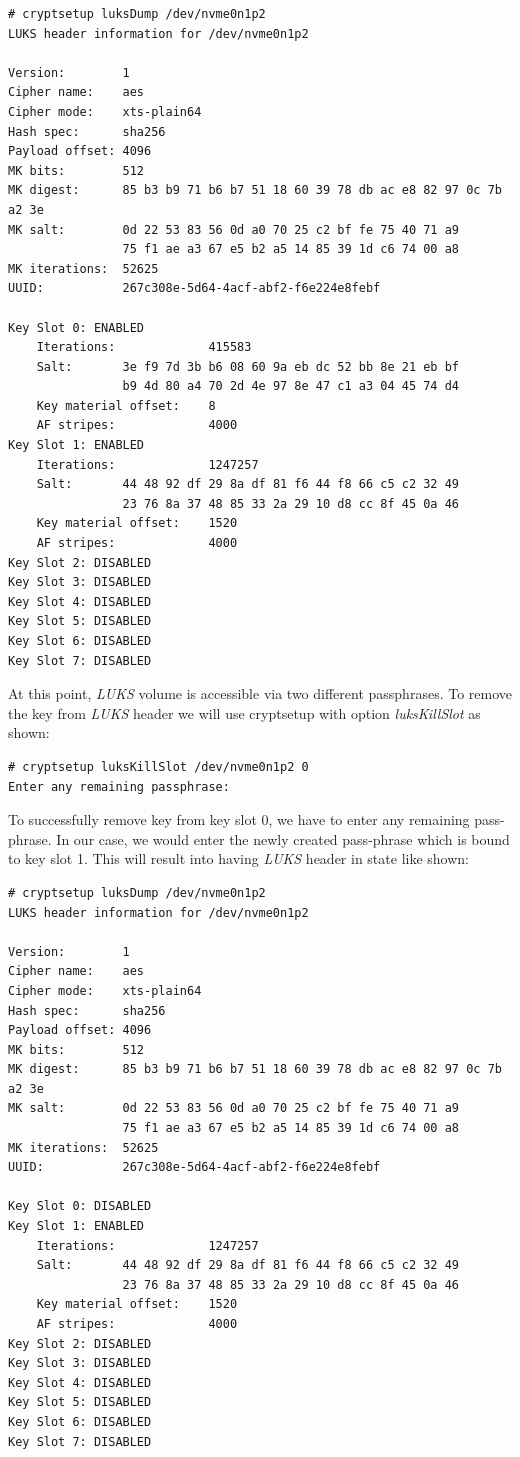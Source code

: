 \begin{lstlisting}[columns=fixed,basicstyle=\ttfamily\footnotesize,tabsize=4,backgroundcolor=\color{yellow!10}]
# cryptsetup luksDump /dev/nvme0n1p2
LUKS header information for /dev/nvme0n1p2

Version:		1
Cipher name:	aes
Cipher mode:	xts-plain64
Hash spec:		sha256
Payload offset:	4096
MK bits:		512
MK digest:		85 b3 b9 71 b6 b7 51 18 60 39 78 db ac e8 82 97 0c 7b a2 3e
MK salt:		0d 22 53 83 56 0d a0 70 25 c2 bf fe 75 40 71 a9
				75 f1 ae a3 67 e5 b2 a5 14 85 39 1d c6 74 00 a8
MK iterations: 	52625
UUID:			267c308e-5d64-4acf-abf2-f6e224e8febf

Key Slot 0: ENABLED
	Iterations:				415583
	Salt:		3e f9 7d 3b b6 08 60 9a eb dc 52 bb 8e 21 eb bf
				b9 4d 80 a4 70 2d 4e 97 8e 47 c1 a3 04 45 74 d4
	Key material offset:	8
	AF stripes:				4000
Key Slot 1: ENABLED
	Iterations:				1247257
	Salt:		44 48 92 df 29 8a df 81 f6 44 f8 66 c5 c2 32 49
				23 76 8a 37 48 85 33 2a 29 10 d8 cc 8f 45 0a 46
	Key material offset:	1520
	AF stripes:				4000
Key Slot 2: DISABLED
Key Slot 3: DISABLED
Key Slot 4: DISABLED
Key Slot 5: DISABLED
Key Slot 6: DISABLED
Key Slot 7: DISABLED
\end{lstlisting}
At this point, {\it LUKS} volume is accessible via two different passphrases.
To remove the key from {\it LUKS} header we will use cryptsetup with option {\it luksKillSlot} as shown:
\begin{lstlisting}[columns=fixed,basicstyle=\ttfamily\footnotesize,tabsize=4,backgroundcolor=\color{yellow!10}]
# cryptsetup luksKillSlot /dev/nvme0n1p2 0
Enter any remaining passphrase:
\end{lstlisting}
To successfully remove key from key slot 0, we have to enter any remaining pass-phrase.
In our case, we would enter the newly created pass-phrase which is bound to key slot 1.
This will result into having {\it LUKS} header in state like shown:
\begin{lstlisting}[columns=fixed,basicstyle=\ttfamily\footnotesize,tabsize=4,backgroundcolor=\color{yellow!10}]
# cryptsetup luksDump /dev/nvme0n1p2
LUKS header information for /dev/nvme0n1p2

Version:		1
Cipher name:	aes
Cipher mode:	xts-plain64
Hash spec:		sha256
Payload offset:	4096
MK bits:		512
MK digest:		85 b3 b9 71 b6 b7 51 18 60 39 78 db ac e8 82 97 0c 7b a2 3e
MK salt:		0d 22 53 83 56 0d a0 70 25 c2 bf fe 75 40 71 a9
				75 f1 ae a3 67 e5 b2 a5 14 85 39 1d c6 74 00 a8
MK iterations: 	52625
UUID:			267c308e-5d64-4acf-abf2-f6e224e8febf

Key Slot 0: DISABLED
Key Slot 1: ENABLED
	Iterations:				1247257
	Salt:		44 48 92 df 29 8a df 81 f6 44 f8 66 c5 c2 32 49
				23 76 8a 37 48 85 33 2a 29 10 d8 cc 8f 45 0a 46
	Key material offset:	1520
	AF stripes:				4000
Key Slot 2: DISABLED
Key Slot 3: DISABLED
Key Slot 4: DISABLED
Key Slot 5: DISABLED
Key Slot 6: DISABLED
Key Slot 7: DISABLED
\end{lstlisting}
